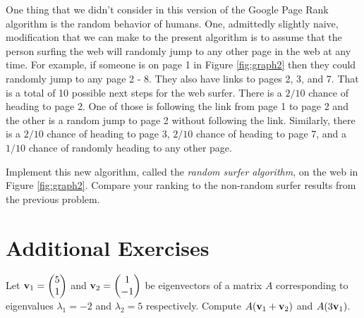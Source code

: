 \begin{problem}
    One thing that we didn't consider in this version of the Google Page Rank algorithm is
    the random behavior of humans.  One, admittedly slightly naive, modification that we
    can make to the present algorithm is to assume that the person surfing the web will
    randomly jump to any other page in the web at any time.  For example, if someone is on
    page 1 in Figure \ref{fig:graph2} then they could randomly jump to any page 2 - 8.
    They also have links to pages 2, 3, and 7.  That is a total of 10 possible next steps
    for the web surfer.  There is a $2/10$ chance of heading to page 2.  One of those is
    following the link from page 1 to page 2 and the other is a random jump to page 2
    without following the link.  Similarly, there is a $2/10$ chance of
    heading to page 3, $2/10$ chance of heading to page 7, and a $1/10$ chance of randomly
    heading to any other page.

    Implement this new algorithm, called the {\it random surfer algorithm}, on the web in
    Figure \ref{fig:graph2}.  Compare your ranking to the non-random surfer results from
    the previous problem.
\end{problem}


\newpage\section{Additional Exercises}
\begin{problem}
    Let ${\bf v}_1 = \begin{pmatrix} 5\\1\end{pmatrix}$ and ${\bf v}_2 =
    \begin{pmatrix}1\\-1\end{pmatrix}$ be eigenvectors of a matrix $A$ corresponding to
    eigenvalues $\lambda_1 = -2$ and $\lambda_2 = 5$ respectively.  Compute $A({\bf v}_1 +
    {\bf v}_2)$ and $A(3{\bf v}_1)$.
\end{problem}

